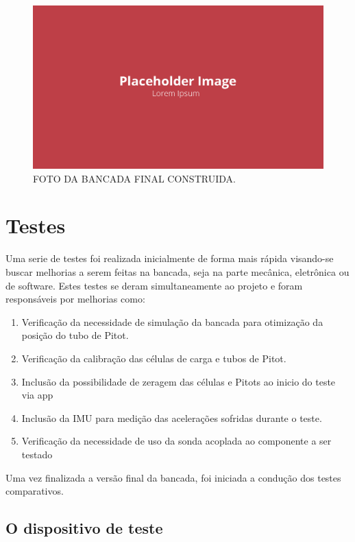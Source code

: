 \begin{figure}[!ht]
    \centering
    \includegraphics[width=.8\linewidth]{figuras/outras/placeholder.png}
    \caption{FOTO DA BANCADA FINAL CONSTRUIDA\cite{autor}.}
    \label{fig:placeholder}
\end{figure}



\section{Testes}

Uma serie de testes foi realizada inicialmente de forma mais rápida visando-se buscar melhorias a serem feitas na bancada, seja na parte mecânica, eletrônica ou de software. Estes testes se deram simultaneamente ao projeto e foram responsáveis por melhorias como:

\begin{enumerate}
    \item Verificação da necessidade de simulação da bancada para otimização da posição do tubo de Pitot.
    \item Verificação da calibração das células de carga e tubos de Pitot.
    \item Inclusão da possibilidade de zeragem das células e Pitots ao inicio do teste via app
    \item Inclusão da IMU para medição das acelerações sofridas durante o teste.
    \item Verificação da necessidade de uso da sonda acoplada ao componente a ser testado
\end{enumerate}

Uma vez finalizada a versão final da bancada, foi iniciada a condução dos testes comparativos.

\subsection{O dispositivo de teste}

